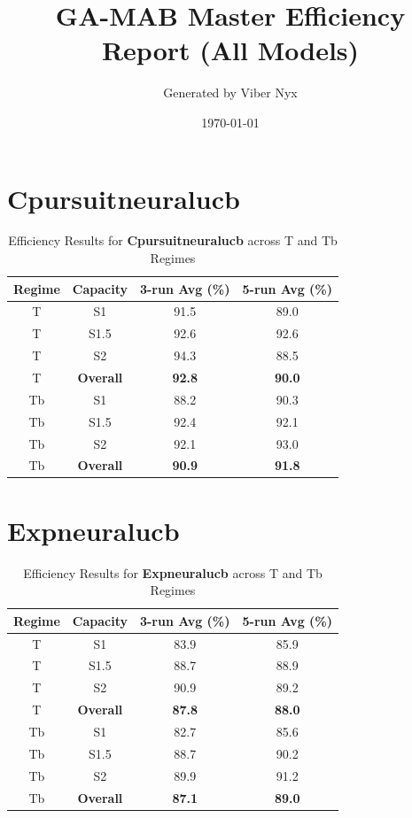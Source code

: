 \documentclass[11pt]{article}
\title{GA-MAB Master Efficiency Report (All Models)}
\author{Generated by Viber Nyx}
\date{\today}
\begin{document}
\maketitle


\section*{Cpursuitneuralucb}
\begin{table}[H]
\centering
\caption{Efficiency Results for \textbf{Cpursuitneuralucb} across T and Tb Regimes}
\begin{tabular}{|c|c|c|c|}
\hline
Regime & Capacity & 3-run Avg (\%) & 5-run Avg (\%) \\ \hline
T & S1 & 91.5 & 89.0 \\ \hline
T & S1.5 & 92.6 & 92.6 \\ \hline
T & S2 & 94.3 & 88.5 \\ \hline
T & \textbf{Overall} & \textbf{92.8} & \textbf{90.0} \\ \hline
Tb & S1 & 88.2 & 90.3 \\ \hline
Tb & S1.5 & 92.4 & 92.1 \\ \hline
Tb & S2 & 92.1 & 93.0 \\ \hline
Tb & \textbf{Overall} & \textbf{90.9} & \textbf{91.8} \\ \hline
\end{tabular}
\end{table}

\section*{Expneuralucb}
\begin{table}[H]
\centering
\caption{Efficiency Results for \textbf{Expneuralucb} across T and Tb Regimes}
\begin{tabular}{|c|c|c|c|}
\hline
Regime & Capacity & 3-run Avg (\%) & 5-run Avg (\%) \\ \hline
T & S1 & 83.9 & 85.9 \\ \hline
T & S1.5 & 88.7 & 88.9 \\ \hline
T & S2 & 90.9 & 89.2 \\ \hline
T & \textbf{Overall} & \textbf{87.8} & \textbf{88.0} \\ \hline
Tb & S1 & 82.7 & 85.6 \\ \hline
Tb & S1.5 & 88.7 & 90.2 \\ \hline
Tb & S2 & 89.9 & 91.2 \\ \hline
Tb & \textbf{Overall} & \textbf{87.1} & \textbf{89.0} \\ \hline
\end{tabular}
\end{table}
\end{document}
